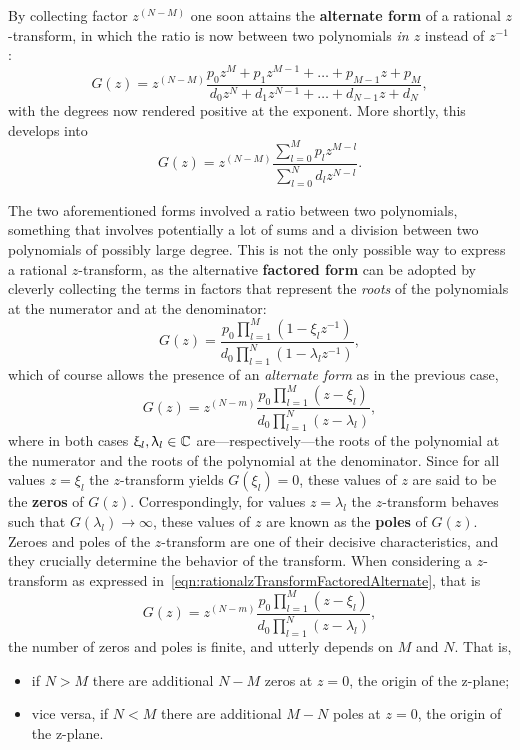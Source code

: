 \documentclass[\documentfontsize, twocolumn]{\classname}
\begin{document}
By collecting factor $z^{(N-M)}$ one soon attains the \textbf{alternate form} of a rational $z$-transform, in which the ratio is now between two polynomials \emph{in $z$} instead of $z^{-1}$:
\begin{equation}\label{eqn:rationalzTransformAlternate}
    G(z) =
    z^{(N-M)}\frac{
        p_0z^M + p_1z^{M-1} + \dots + p_{M-1} z + p_M
    } {
        d_0z^N + d_1z^{N-1} + \dots + d_{N-1} z + d_N
    },
\end{equation}
with the degrees now rendered positive at the exponent. More shortly, this develops into
\[
    G(z) =
    z^{(N-M)}\frac{
        \sum_{l=0}^M p_l z^{M-l}
    } {
        \sum_{l=0}^N d_l z^{N-l}
    }.
\]

The two aforementioned forms involved a ratio between two polynomials, something that involves potentially a lot of sums and a division between two polynomials of possibly large degree. This is not the only possible way to express a rational $z$-transform, as the alternative \textbf{factored form} can be adopted by cleverly collecting the terms in factors that represent the \emph{roots} of the polynomials at the numerator and at the denominator:
\begin{equation}\label{eqn:rationalzTransformFactored}
    G(z) =
    \frac {
        p_0 \prod_{l=1}^M\left(1 - \xi_l z^{-1}\right)
    } {
        d_0 \prod_{l=1}^N\left(1 - \lambda_l z^{-1}\right)
    },
\end{equation}
which of course allows the presence of an \emph{alternate form} as in the previous case,
\begin{equation}\label{eqn:rationalzTransformFactoredAlternate}
    G(z) =
    z^{(N-m)}\frac {
        p_0 \prod_{l=1}^M\left(z - \xi_l\right)
    } {
        d_0 \prod_{l=1}^N\left(z - \lambda_l\right)
    },
\end{equation}
where in both cases $\upxi_l,\uplambda_l \in \mathbb C$ are---respectively---the roots of the polynomial at the numerator and the roots of the polynomial at the denominator. Since for all values $z = \xi_l$ the $z$-transform yields $G(\xi_l) = 0$, these values of $z$ are said to be the \textbf{zeros} of $G(z)$. Correspondingly, for values $z = \lambda_l$ the $z$-transform behaves such that $G(\lambda_l) \rightarrow \infty$, these values of $z$ are known as the \textbf{poles} of $G(z)$. Zeroes and poles of the $z$-transform are one of their decisive characteristics, and they crucially determine the behavior of the transform. When considering a $z$-transform as expressed in~\ref{eqn:rationalzTransformFactoredAlternate}, that is
\[
    G(z) =
    z^{(N-m)}\frac {
        p_0 \prod_{l=1}^M\left(z - \xi_l\right)
    } {
        d_0 \prod_{l=1}^N\left(z - \lambda_l\right)
    },
\]
the number of zeros and poles is finite, and utterly depends on $M$ and $N$. That is,
\begin{itemize}
    \item if $N > M$ there are additional $N - M$ zeros at $z=0$, the origin of the z-plane;
    \item vice versa, if $N < M$ there are additional $M - N$ poles at $z=0$, the origin of the z-plane.
\end{itemize}
\end{document}

